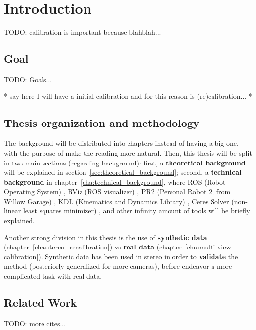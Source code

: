 \chapter{Introduction}
\label{cha:intro}


TODO:
calibration is important because blahblah...


\section{Goal}

TODO: Goals...

* say here I will have a initial calibration and for this reason is (re)calibration...
*


\section{Thesis organization and methodology}

The background will be distributed into chapters instead of having a big one, with the purpose of make the reading more natural. Then, this thesis will be split in two main sections (regarding background): first, a \textbf{theoretical background} will be explained in section~\ref{sec:theoretical_background}; second, a \textbf{technical background} in chapter~\ref{cha:technical_background}, where ROS (Robot Operating System) \cite{ROS}, RViz (ROS visualizer) \cite{RViz}, PR2 (Personal Robot 2, from Willow Garage) \cite{PR2}, KDL (Kinematics and Dynamics Library) \cite{KDL}, Ceres Solver (non-linear least squares minimizer) \cite{ceres}, and other infinity amount of tools will be briefly explained.

Another strong division in this thesis is the use of \textbf{synthetic data} (chapter~\ref{cha:stereo_recalibration}) vs \textbf{real data} (chapter~\ref{cha:multi-view calibration}). Synthetic data has been used in stereo in order to \textbf{validate} the method (posteriorly generalized for more cameras), before endeavor a more complicated task with real data.






\section{Related Work}

TODO:
more cites...

